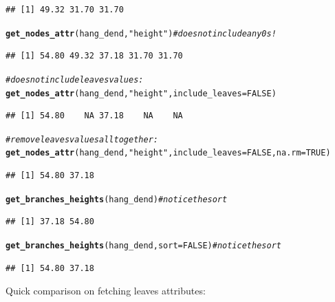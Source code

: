 \documentclass[shortnames,nojss,article]{jss}\usepackage[]{graphicx}\usepackage[]{color}
\makeatletter
\newcommand{\hlnum}[1]{\textcolor[rgb]{0.686,0.059,0.569}{#1}}%
\newcommand{\hlstr}[1]{\textcolor[rgb]{0.192,0.494,0.8}{#1}}%
\newcommand{\hlcom}[1]{\textcolor[rgb]{0.678,0.584,0.686}{\textit{#1}}}%
\newcommand{\hlstd}[1]{\textcolor[rgb]{0.345,0.345,0.345}{#1}}%
\newcommand{\hlkwc}[1]{\textcolor[rgb]{0.333,0.667,0.333}{#1}}%
\newcommand{\hlkwd}[1]{\textcolor[rgb]{0.737,0.353,0.396}{\textbf{#1}}}%
\newenvironment{kframe}{%
 \def\at@end@of@kframe{}%
 \ifinner\ifhmode%
  \def\at@end@of@kframe{\end{minipage}}%
  \begin{minipage}{\columnwidth}%
 \fi\fi%
 \def\FrameCommand##1{\hskip\@totalleftmargin \hskip-\fboxsep
 \colorbox{shadecolor}{##1}\hskip-\fboxsep
     \hskip-\linewidth \hskip-\@totalleftmargin \hskip\columnwidth}%
 \MakeFramed {\advance\hsize-\width
   \@totalleftmargin\z@ \linewidth\hsize
   \@setminipage}}%
 {\par\unskip\endMakeFramed%
 \at@end@of@kframe}
\newenvironment{knitrout}{}{} %
\makeatother
\begin{document}
\begin{knitrout}
\begin{kframe}
\begin{verbatim}
## [1] 49.32 31.70 31.70
\end{verbatim}
\begin{alltt}
\hlkwd{get_nodes_attr}\hlstd{(hang_dend,} \hlstr{"height"}\hlstd{)}  \hlcom{# does not include any 0s!}
\end{alltt}
\begin{verbatim}
## [1] 54.80 49.32 37.18 31.70 31.70
\end{verbatim}
\begin{alltt}
\hlcom{# does not include leaves values:}
\hlkwd{get_nodes_attr}\hlstd{(hang_dend,} \hlstr{"height"}\hlstd{,} \hlkwc{include_leaves} \hlstd{=} \hlnum{FALSE}\hlstd{)}
\end{alltt}
\begin{verbatim}
## [1] 54.80    NA 37.18    NA    NA
\end{verbatim}
\begin{alltt}
\hlcom{# remove leaves values all together:}
\hlkwd{get_nodes_attr}\hlstd{(hang_dend,} \hlstr{"height"}\hlstd{,} \hlkwc{include_leaves} \hlstd{=} \hlnum{FALSE}\hlstd{,} \hlkwc{na.rm} \hlstd{=} \hlnum{TRUE}\hlstd{)}
\end{alltt}
\begin{verbatim}
## [1] 54.80 37.18
\end{verbatim}
\begin{alltt}
\hlkwd{get_branches_heights}\hlstd{(hang_dend)}  \hlcom{# notice the sort}
\end{alltt}
\begin{verbatim}
## [1] 37.18 54.80
\end{verbatim}
\begin{alltt}
\hlkwd{get_branches_heights}\hlstd{(hang_dend,} \hlkwc{sort} \hlstd{=} \hlnum{FALSE}\hlstd{)}  \hlcom{# notice the sort}
\end{alltt}
\begin{verbatim}
## [1] 54.80 37.18
\end{verbatim}
\begin{alltt}

\end{alltt}
\end{kframe}
\end{knitrout}



Quick comparison on fetching leaves attributes:
\end{document}
